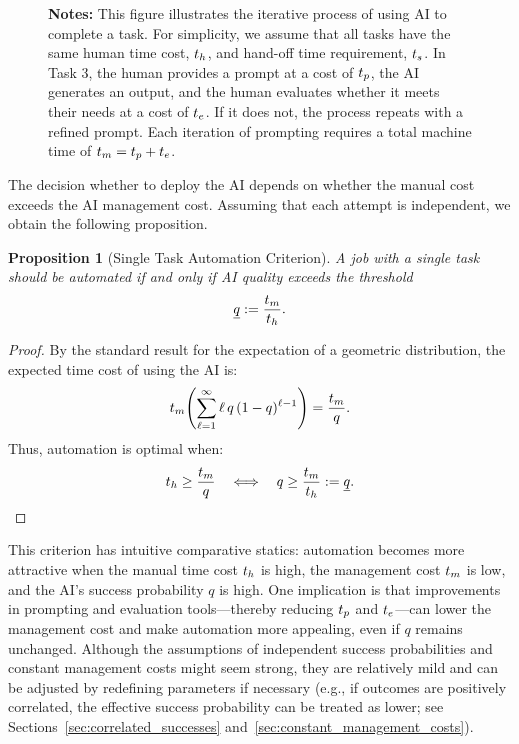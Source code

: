 \documentclass{article}
\theoremstyle{plain}
\theoremstyle{plain}
\newtheorem{proposition}[theorem]{Proposition}
\begin{document}
\begin{figure}[h]
\begin{center}
{\begin{tikzpicture}[node distance=1.8cm]
\end{tikzpicture}}
   \end{center}
  \footnotesize{\textbf{Notes:} This figure illustrates the iterative process of using AI to complete a task.  
  For simplicity, we assume that all tasks have the same human time cost, $\humantime$, and hand-off time requirement, $\handofftime{}$.  
  In Task 3, the human provides a prompt at a cost of $\timecost{p}$, the AI generates an output, and the human evaluates whether it meets their needs at a cost of $\timecost{e}$.  
  If it does not, the process repeats with a refined prompt.  
  Each iteration of prompting requires a total machine time of $\machinetime = \timecost{p} + \timecost{e}$.}
\end{figure}

The decision whether to deploy the AI depends on whether the manual cost exceeds the AI management cost.
Assuming that each attempt is independent, we obtain the following proposition.

\begin{proposition}[Single Task Automation Criterion] \label{proposition:single}
A job with a single task should be automated if and only if AI quality exceeds the threshold
$$\underline{q} := \frac{\machinetime}{\humantime}.$$
\end{proposition}

\begin{proof}
By the standard result for the expectation of a geometric distribution, the expected time cost of using the AI is:
$$\machinetime \Biggl( \sum_{\ell=1}^{\infty} \ell\,q\,(1 - q)^{\ell - 1} \Biggr) = \frac{\machinetime}{q}.$$
Thus, automation is optimal when:
$$\humantime \geq \frac{\machinetime}{q} \quad \Longleftrightarrow \quad q \geq \frac{\machinetime}{\humantime} := \underline{q}.$$
\end{proof}

This criterion has intuitive comparative statics: automation becomes more attractive when the manual time cost $\humantime$ is high, the management cost $\machinetime$ is low, and the AI's success probability $q$ is high.
One implication is that improvements in prompting and evaluation tools---thereby reducing $\timecost{p}$ and $\timecost{e}$---can lower the management cost and make automation more appealing, even if $q$ remains unchanged.
Although the assumptions of independent success probabilities and constant management costs might seem strong, they are relatively mild and can be adjusted by redefining parameters if necessary (e.g., if outcomes are positively correlated, the effective success probability can be treated as lower; see Sections~\ref{sec:correlated_successes} and~\ref{sec:constant_management_costs}).
\end{document}

